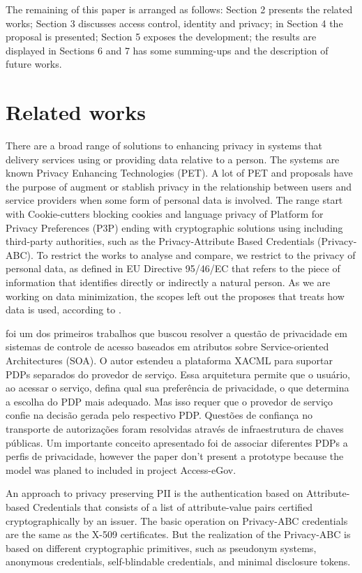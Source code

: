 \documentclass{doublecol-new}
\begin{document}
The remaining of this paper is arranged as follows: Section 2 presents the related works; Section 3 discusses access control, identity and privacy; in Section 4 the proposal is presented; Section 5 exposes the development; the results are displayed in Sections 6 and 7 has some summing-ups and the description of future works.

\section{Related works}
There are a broad range of solutions to enhancing privacy in systems that delivery services using or providing data relative to a person. The systems are known Privacy Enhancing Technologies (PET). A lot of PET and proposals have the purpose of augment or stablish privacy in the relationship between users and service providers when some form of personal data is involved. The range start with Cookie-cutters blocking cookies and language privacy of Platform for Privacy Preferences (P3P) ending with cryptographic solutions using including third-party authorities, such as the Privacy-Attribute Based Credentials (Privacy-ABC). To restrict the works to analyse and compare, we restrict to the privacy of personal data, as defined in EU Directive 95/46/EC\cite{directive199595} that refers to the piece of information that identifies directly or indirectly a natural person. As we are working on data minimization, the scopes left out the proposes that treats how data is used, according to \citep{mondal2014beyond}.

\citep{kolter2007privacy} foi um dos primeiros trabalhos que buscou resolver a questão de privacidade em sistemas de controle de acesso baseados em atributos sobre Service-oriented Architectures (SOA). O autor estendeu a plataforma XACML para suportar PDPs separados do provedor de serviço. Essa arquitetura permite que o usuário, ao acessar o serviço, defina qual sua preferência de privacidade, o que determina a escolha do PDP mais adequado. Mas isso requer que o provedor de serviço confie na decisão gerada pelo respectivo PDP. Questões de confiança no transporte de autorizações foram resolvidas através de infraestrutura de chaves públicas. Um importante conceito apresentado foi de associar diferentes PDPs a perfis de privacidade, however the paper don't present a prototype because the model was planed to included in project Access-eGov\cite{pernulAccesseGov}.

An approach to privacy preserving PII is the authentication based on Attribute-based Credentials that consists of a list of attribute-value pairs certified cryptographically by an issuer. The basic operation on Privacy-ABC credentials are the same as the X-509 certificates. But the realization of the Privacy-ABC is based on different cryptographic primitives, such as pseudonym systems\citep{chaum1981untraceable}, anonymous credentials\citep{camenisch2001efficient}, self-blindable credentials\citep{verheul2001self}, and minimal disclosure tokens\citep{brands2000rethinking}.
\end{document}
